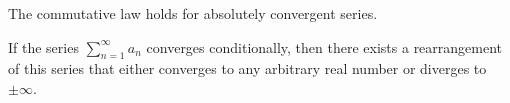 \begin{corollary}
  The commutative law holds for absolutely convergent series.
\end{corollary}

\begin{theorem}
  If the series $\sum_{n = 1}^{\infty} a_n$ converges conditionally,
  then there exists a rearrangement of this series that either
  converges to any arbitrary real number or diverges to $\pm \infty$.
\end{theorem}
